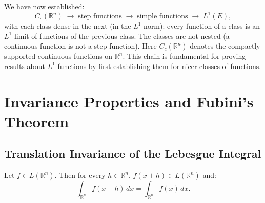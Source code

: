 \documentclass[11pt]{report}
\begin{document}
\begin{rembox}
We have now established:
\[
C_c(\mathbb{R}^n) \;\longrightarrow\; \text{step functions} \;\longrightarrow\; \text{simple functions} \;\longrightarrow\; L^1(E),
\]
with each class dense in the next (in the $L^1$ norm): every function of a class is an $L^1$-limit of functions of the previous class. The classes are not nested (a continuous function is not a step function). Here $C_c(\mathbb{R}^n)$ denotes the compactly supported continuous functions on $\mathbb{R}^n$. This chain is fundamental for proving results about $L^1$ functions by first establishing them for nicer classes of functions.
\end{rembox}

\newpage
\section{Invariance Properties and Fubini's Theorem}

\subsection{Translation Invariance of the Lebesgue Integral}

\begin{thmbox}
Let $f \in L(\mathbb{R}^n)$. Then for every $h \in \mathbb{R}^n$, $f(x + h) \in L(\mathbb{R}^n)$ and:
\[
\int_{\mathbb{R}^n} f(x + h)\,dx = \int_{\mathbb{R}^n} f(x)\,dx.
\]
\end{thmbox}
\end{document}
